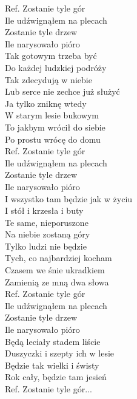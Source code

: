 
Ref. Zostanie tyle gór \tab{} \\
 Ile udźwignąłem na plecach \\
 Zostanie tyle drzew \tab{}\\
 Ile narysowało pióro \tab{} \\
\hops
Tak gotowym trzeba być  \\
Do każdej ludzkiej podróży \\
Tak zdecydują w niebie \\
Lub serce nie zechce już służyć \\
Ja tylko zniknę wtedy \\
W starym lesie bukowym \\
To jakbym wrócił do siebie \\
Po prostu wrócę do domu \\
\hops
Ref. Zostanie tyle gór  \\
 Ile udźwignąłem na plecach \\
 Zostanie tyle drzew \\
 Ile narysowało pióro  \\
\hops
I wszystko tam będzie jak w życiu \\
I stół i krzesła i buty \\
Te same, nieporuszone \\
Na niebie zostaną góry \\
Tylko ludzi nie będzie \\
Tych, co najbardziej kocham \\
Czasem we śnie ukradkiem \\
Zamienią ze mną dwa słowa \\
\hops
Ref. Zostanie tyle gór  \\
 Ile udźwignąłem na plecach \\
 Zostanie tyle drzew \\
 Ile narysowało pióro  \\
\hops
Będą leciały stadem liście \\
Duszyczki i szepty ich w lesie \\
Będzie tak wielki i świsty \\
Rok cały, będzie tam jesień \\
\hops
Ref. Zostanie tyle gór...
